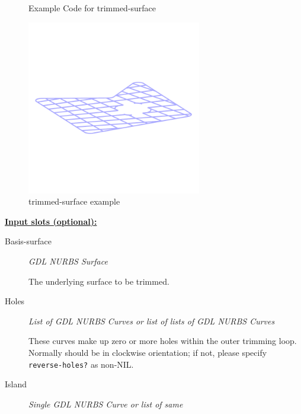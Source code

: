 \documentclass [11pt]{book}
\begin{document}
\begin{itemize}
\begin{figure}
\caption{Example Code for trimmed-surface}

\label{fig:example-code-trimmed-surface}

\end{figure}

\begin{figure}
\begin{center}
\includegraphics[width=3in,height=3in]{../images/example-trimmed-surface.pdf}
\end{center}

\caption{trimmed-surface example}

\label{fig:trimmed-surface}

\end{figure}





\textbf{
\underline{Input slots (optional):}}

\begin{description}

\item [Basis-surface]
\emph{GDL NURBS Surface}

 The underlying surface to be trimmed.




\item [Holes]
\emph{List of GDL NURBS Curves or list of lists of GDL NURBS Curves}

 These curves make up zero or more holes within the outer trimming loop.
Normally should be in clockwise orientation; if not, please specify \texttt{reverse-holes?} as non-NIL.




\item [Island]
\emph{Single GDL NURBS Curve or list of same}


\end{description}
\end{itemize}
\end{document}
